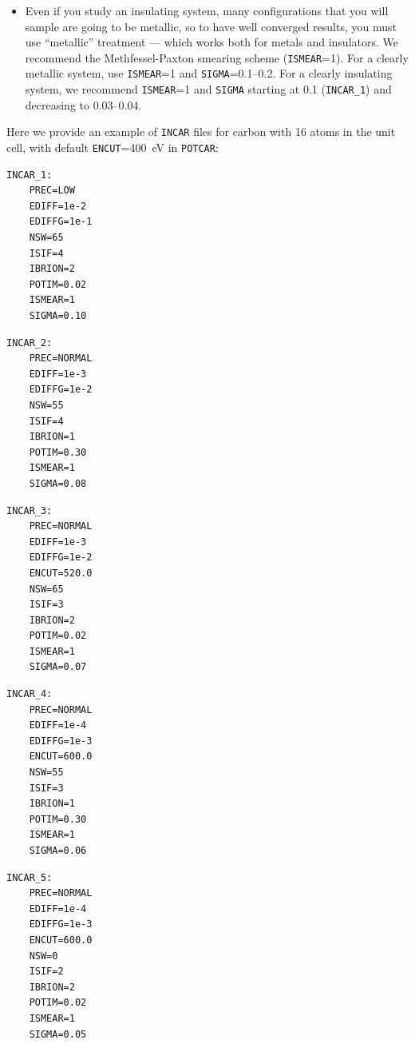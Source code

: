 \documentclass[12pt]{article}
\newcommand{\keyword}[1]{\texttt{#1}}
\newcommand{\file}[1]{\texttt{#1}}
\begin{document}
\begin{itemize}
\item Even if you study an insulating system, many configurations that you will
sample are going to be metallic, so to have well converged results, you must use
``metallic'' treatment --- which works both for metals and insulators. We
recommend the Methfessel-Paxton smearing scheme (\keyword{ISMEAR}=1). For a
clearly metallic system, use \keyword{ISMEAR}=1 and \keyword{SIGMA}=0.1--0.2.
For a clearly insulating system, we recommend \keyword{ISMEAR}=1 and
\keyword{SIGMA} starting at 0.1 (\file{INCAR\_1}) and decreasing to 0.03--0.04.

\end{itemize}


Here we provide an example of \file{INCAR} files for carbon with 16 atoms in
the unit cell, with default \keyword{ENCUT}=400~eV in \file{POTCAR}:

\begin{multicols}{3}
\begin{verbatim}
INCAR_1:
    PREC=LOW
    EDIFF=1e-2
    EDIFFG=1e-1
    NSW=65
    ISIF=4
    IBRION=2
    POTIM=0.02
    ISMEAR=1 
    SIGMA=0.10
\end{verbatim}

\begin{verbatim}
INCAR_2:
    PREC=NORMAL
    EDIFF=1e-3
    EDIFFG=1e-2
    NSW=55
    ISIF=4
    IBRION=1
    POTIM=0.30
    ISMEAR=1 
    SIGMA=0.08
\end{verbatim}

\begin{verbatim}
INCAR_3:
    PREC=NORMAL
    EDIFF=1e-3
    EDIFFG=1e-2
    ENCUT=520.0
    NSW=65
    ISIF=3
    IBRION=2
    POTIM=0.02
    ISMEAR=1 
    SIGMA=0.07
\end{verbatim}
\end{multicols}

\begin{multicols}{2}
\begin{verbatim}
INCAR_4:
    PREC=NORMAL
    EDIFF=1e-4
    EDIFFG=1e-3
    ENCUT=600.0
    NSW=55
    ISIF=3
    IBRION=1
    POTIM=0.30
    ISMEAR=1 
    SIGMA=0.06
\end{verbatim}

\begin{verbatim}
INCAR_5:
    PREC=NORMAL
    EDIFF=1e-4
    EDIFFG=1e-3
    ENCUT=600.0
    NSW=0
    ISIF=2
    IBRION=2
    POTIM=0.02
    ISMEAR=1 
    SIGMA=0.05
\end{verbatim}
\end{multicols}
\end{document}
